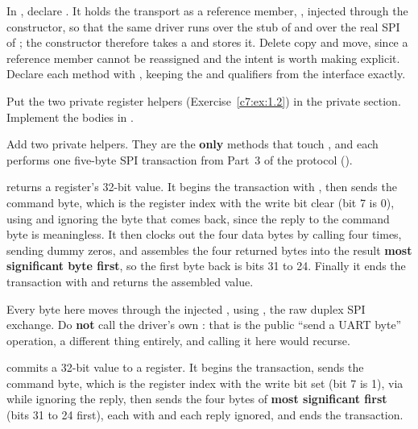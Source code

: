 \label{c7:ex:1.1}
In , declare . It holds
the transport as a reference member, , injected through the
constructor, so that the same driver runs over the stub of  and over the real SPI of
; the constructor therefore takes a  and stores it.
Delete copy and move, since a reference member cannot be reassigned and the intent is worth making
explicit. Declare each  method with , keeping the  and
 qualifiers from the interface exactly.

Put the two private register helpers (Exercise~\ref{c7:ex:1.2}) in the private section. Implement
the bodies in .

\label{c7:ex:1.2}
Add two private helpers. They are the \textbf{only} methods that touch , and each
performs one five-byte SPI transaction from Part~3 of the protocol ().

 returns a register's 32-bit value. It begins the transaction with
, then sends the command byte, which is the register index with the write
bit clear (bit 7 is 0), using  and ignoring the byte that comes
back, since the reply to the command byte is meaningless. It then clocks out the four data bytes by
calling  four times, sending dummy zeros, and assembles the four
returned bytes into the result \textbf{most significant byte first}, so the first byte back is bits
31 to 24. Finally it ends the transaction with  and returns the assembled
value.

Every byte here moves through the injected , using ,
the raw duplex SPI exchange. Do \textbf{not} call the driver's own : that is the public
``send a UART byte'' operation, a different thing entirely, and calling it here would recurse.

 commits a 32-bit value to a register. It begins the transaction, sends
the command byte, which is the register index with the write bit set (bit 7 is 1), via
 while ignoring the reply, then sends the four bytes of
 \textbf{most significant first} (bits 31 to 24 first), each with
 and each reply ignored, and ends the transaction.

